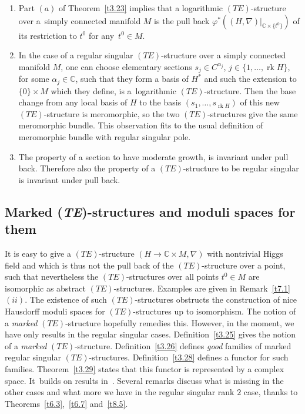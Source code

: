 \documentclass[10pt,a4paper]{amsart}
\numberwithin{equation}{section}
\numberwithin{figure}{section}
\newcommand{\C}{{\mathbb C}}
\newcommand{\nnn}{\nabla}
\DeclareMathOperator{\rk}{rk}
\begin{document}
\begin{Remarks}\quad%
\begin{enumerate}\itemsep=0pt
\item[$(i)$] Part $(a)$ of Theorem~\ref{t3.23} implies that a
logarithmic $(TE)$-structure over a~simply connected
manifold $M$ is the pull back $\varphi^*((H,\nnn)|_{\C\times \{t^0\}})$
of its restriction to $t^0$ for any~$t^0\in M$.

\item[$(ii)$] In the case of a regular singular $(TE)$-structure
over a simply connected manifold $M$, one can choose
elementary sections $s_j\in C^{\alpha_j}$, $j\in\{1,\dots ,\rk H\}$,
for some $\alpha_j\in\C$, such that they form a basis of $H^*$
and such the extension to $\{0\}\times M$ which they define,
is a~logarithmic $(TE)$-structure.
Then the base change from any local basis of $H$ to the basis
$(s_1,\dots ,s_{\rk H})$ of this new $(TE)$-structure is meromorphic,
so the two $(TE)$-structures give the same meromorphic bundle.
This observation fits to the usual definition of meromorphic
bundle with regular singular pole.

\item[$(iii)$] The property of a section to have moderate growth,
is invariant under pull back. Therefore also the property
of a $(TE)$-structure to be regular singular is invariant
under pull back.
\end{enumerate}
\end{Remarks}



\subsection{Marked (\emph{TE})-structures and moduli spaces for them}


It is easy to give a $(TE)$-structure $(H\to\C\times M,\nnn)$
with nontrivial Higgs field and which is thus not the
pull back of the $(TE)$-structure over a point, such that
nevertheless the $(TE)$-structures over all points
$t^0\in M$ are isomorphic as abstract $(TE)$-structures.
Examples are given in Remark~\ref{t7.1}$(ii)$.
The existence of such $(TE)$-structures
obstructs the construction of nice Hausdorff
moduli spaces for $(TE)$-structures up to isomorphism.
The notion of a {\it marked} $(TE)$-structure hopefully
remedies this. However, in the moment, we have only results
in the regular singular cases.
Definition~\ref{t3.25} gives the notion of a {\it marked}
$(TE)$-structure. Definition~\ref{t3.26} defines {\it good}
families of marked regular singular $(TE)$-structures.
Definition~\ref{t3.28} defines a functor for such families.
Theorem~\ref{t3.29} states that this functor is represented
by a complex space. It~builds on results in~\cite[Chapter~7]{HS10}.
Several remarks discuss what is missing in the other cases
and what more we have in the regular singular rank $2$ case,
thanks to Theorems~\ref{t6.3},~\ref{t6.7} and~\ref{t8.5}.
\end{document}
